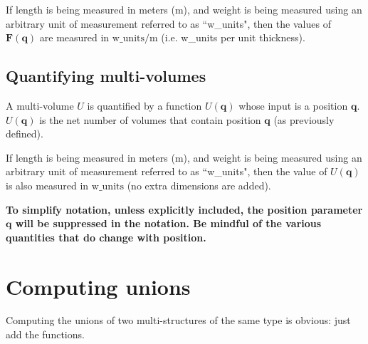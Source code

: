 \documentclass{book}
\begin{document}
If length is being measured in meters (m), and weight is being measured using an arbitrary unit of measurement referred to as ``w\_units", then the values of \(\mathbf{F}(\mathbf{q})\) are measured in \(\text{w\_units}/\text{m}\) (i.e. w\_units per unit thickness).





\subsection*{Quantifying multi-volumes}

A multi-volume \(U\) is quantified by a function \(U(\mathbf{q})\) whose input is a position \(\mathbf{q}\). \(U(\mathbf{q})\) is the net number of volumes that contain position \(\mathbf{q}\) (as previously defined).

If length is being measured in meters (m), and weight is being measured using an arbitrary unit of measurement referred to as ``w\_units", then the value of \(U(\mathbf{q})\) is also measured in \(\text{w\_units}\) (no extra dimensions are added).

\vspace{5mm}

{\bf To simplify notation, unless explicitly included, the position parameter \(\mathbf{q}\) will be suppressed in the notation. Be mindful of the various quantities that do change with position.}



\section{Computing unions}

Computing the unions of two multi-structures of the same type is obvious: just add the functions.
\end{document}
